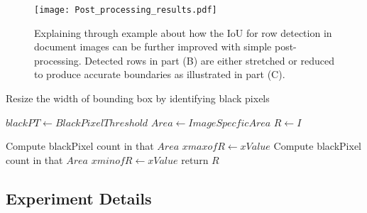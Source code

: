 \documentclass{ieeeaccess}
\begin{document}
\begin{figure*}[ht]
    \texttt{[image: Post\_processing\_results.pdf]}
    \caption{Explaining through example about how the IoU for row detection in document images can be further improved with simple post-processing. Detected rows in part (B) are either stretched or reduced to produce accurate boundaries as illustrated in part (C).}
    \label{fig:post_processing_results}
\end{figure*}

\renewcommand{\algorithmicrequire}{\textbf{Input: }\textit{I}: 2d array of predicted bounding box}
\renewcommand{\algorithmicensure}{\textbf{Output: }\textit{R}: Improved bounding box}


\begin{algorithm}

  \caption{Resize the width of bounding box by identifying black pixels}
  \begin{algorithmic}[1]
    \REQUIRE 
    \ENSURE
     \STATE $blackPT \gets  Black Pixel Threshold $
     \STATE $Area \gets  Image Specfic Area $
\STATE $R \gets I$
      
       
            \STATE Compute blackPixel count in that $Area$
                \STATE $xmax of R \gets xValue$
            \ENDIF
        \ENDIF
      \ENDFOR
        
            \STATE Compute blackPixel count in that $Area$
                \STATE $xmin of R \gets xValue$
            \ENDIF
        \ENDIF
      \ENDFOR
    \STATE return $R$
  \end{algorithmic}
\label{algo}
\end{algorithm}




\subsection{Experiment Details}
\end{document}
